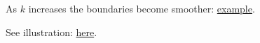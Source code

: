 As $k$ increases the boundaries become smoother:
\href{https://images.squarespace-cdn.com/content/v1/5d782753c70af105c29a9b14/1580261947016-XODPUVKWPGGMJJMAXSNF/Screen+Shot+2020-01-28+at+8.38.55+PM.png}{example}.

See illustration: \href{https://scikit-learn.org/stable/auto_examples/classification/plot_classifier_comparison.html}{here}.
